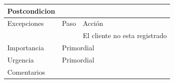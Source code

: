 \begin{table}[th!]
\begin{tabular}{|l|l|l|}
		Postcondicion                                                                & \multicolumn{2}{l|}{}                                                                                                                                                      \\ \hline
		Excepciones                                                                  & Paso                         & Acción                                                                                                                                                      \\ \hline
		&                             & El cliente no esta registrado                                                                                                                                               \\ \hline
		Importancia                                                                  & \multicolumn{2}{l|}{Primordial}                                                                                                                                                            \\ \hline
		Urgencia                                                                     & \multicolumn{2}{l|}{Primordial}                                                                                                                                                            \\ \hline
		Comentarios                                                                  & \multicolumn{2}{l|}{}                                                                                                                                                                      \\ \hline
	\end{tabular}
\end{table}


